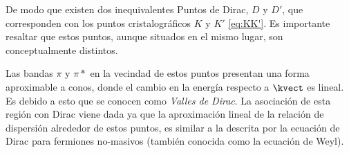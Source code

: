 De modo que existen dos inequivalentes Puntos de Dirac, $ D $ y $ D' $, que 
corresponden con los puntos cristalográficos $ K $ y $ K' $ \eqref{eq:KK'}. Es 
importante resaltar que estos puntos, aunque situados en el mismo lugar, son 
conceptualmente distintos.

Las bandas $ \pi $ y $ \pi* $ en la vecindad de estos puntos presentan una forma 
aproximable a conos, donde el cambio en la energía respecto a $ \kvect $ es lineal. 
Es debido a esto que se conocen como \emph{Valles de Dirac}. La asociación de esta 
región con Dirac viene dada ya que la aproximación lineal de la relación de 
dispersión alrededor de estos puntos, es similar a la descrita por la ecuación de 
Dirac para fermiones no-masivos (también conocida como la ecuación de Weyl).
